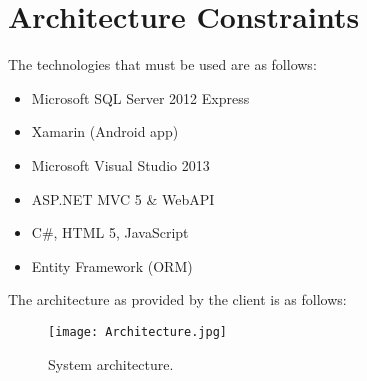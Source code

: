 \documentclass[11pt,titlepage]{article}
\begin{document}
\section{Architecture Constraints}
The technologies that must be used are as follows:
\begin{itemize}
\item Microsoft SQL Server 2012 Express
\item Xamarin (Android app)
\item Microsoft Visual Studio 2013
\item ASP.NET MVC 5 \& WebAPI
\item C\#, HTML 5, JavaScript
\item Entity Framework (ORM)
\end{itemize}
The architecture as provided by the client is as follows:
\begin{figure}[H]
\begin{center}
\texttt{[image: Architecture.jpg]}
\caption{System architecture.}
\end{center}
\end{figure}
\end{document}
